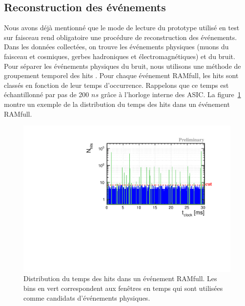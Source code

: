 \subsection{Reconstruction des événements}
\label{sec.trivent}
Nous avons déjà mentionné que le mode de lecture du prototype utilisé en test sur faisceau rend obligatoire une procédure de reconstruction des événements. Dans les données collectées, on trouve les événements physiques (muons du faisceau et cosmiques, gerbes hadroniques et électromagnétiques) et du bruit. Pour séparer les événements physiques du bruit, nous utilisons une méthode de groupement temporel des hits \cite{sdhcal-com}. Pour chaque événement RAMfull, les hits sont classés en fonction de leur temps d’occurrence. Rappelons que ce temps est échantillonné par pas de 200 $ns$ grâce à l'horloge interne des ASIC. La figure~\ref{fig:time_spectrum} montre un exemple de la distribution du temps des hits dans un événement RAMfull. 
\begin{figure}[!ht]
  \begin{center}
    \includegraphics[width=.9\textwidth]{SDHCAL/figs/time_spectrum.pdf}
    \caption{Distribution du temps des hits dans un événement RAMfull. Les bins en vert correspondent aux fenêtres en temps qui sont utilisées comme candidats d'événements physiques.}
    \label{fig:time_spectrum}
  \end{center}
\end{figure}
